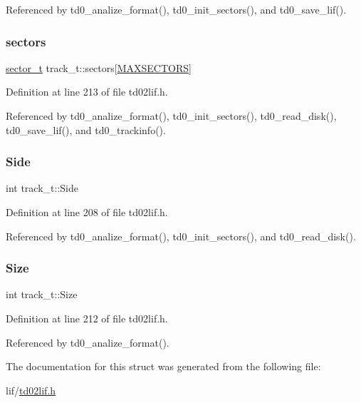 Referenced by td0\+\_\+analize\+\_\+format(), td0\+\_\+init\+\_\+sectors(), and td0\+\_\+save\+\_\+lif().

\mbox{\label{structtrack__t_af5a5bc7c09b032d06fe21a18f08772db}} 
\subsubsection{\texorpdfstring{sectors}{sectors}}
{\footnotesize\ttfamily \hyperlink{structsector__t}{sector\+\_\+t} track\+\_\+t\+::sectors\mbox{[}\hyperlink{td02lif_8h_a39ad5a6dea9e9b9d5314d32f397fee7d}{M\+A\+X\+S\+E\+C\+T\+O\+RS}\mbox{]}}



Definition at line 213 of file td02lif.\+h.



Referenced by td0\+\_\+analize\+\_\+format(), td0\+\_\+init\+\_\+sectors(), td0\+\_\+read\+\_\+disk(), td0\+\_\+save\+\_\+lif(), and td0\+\_\+trackinfo().

\mbox{\label{structtrack__t_ad8ed890a8194525d7162dee414180635}} 
\subsubsection{\texorpdfstring{Side}{Side}}
{\footnotesize\ttfamily int track\+\_\+t\+::\+Side}



Definition at line 208 of file td02lif.\+h.



Referenced by td0\+\_\+analize\+\_\+format(), td0\+\_\+init\+\_\+sectors(), and td0\+\_\+read\+\_\+disk().

\mbox{\label{structtrack__t_ab0e996e402d1d61b694b80a1c866177e}} 
\subsubsection{\texorpdfstring{Size}{Size}}
{\footnotesize\ttfamily int track\+\_\+t\+::\+Size}



Definition at line 212 of file td02lif.\+h.



Referenced by td0\+\_\+analize\+\_\+format().



The documentation for this struct was generated from the following file\+:\begin{DoxyCompactItemize}
\item 
lif/\hyperlink{td02lif_8h}{td02lif.\+h}\end{DoxyCompactItemize}
